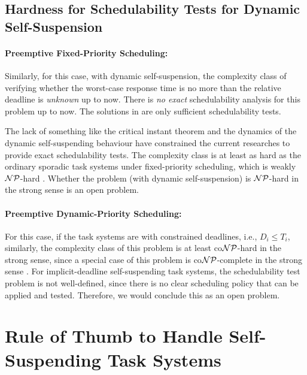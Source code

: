 \subsection{Hardness for Schedulability Tests for Dynamic Self-Suspension}
\paragraph{Preemptive Fixed-Priority Scheduling:}   

Similarly, for this case, with dynamic self-suspension, the complexity class of verifying whether the worst-case response time is no more than the relative deadline is \emph{unknown} up to now. There is \emph{no exact} schedulability analysis for this problem up to now. The solutions in \cite{Liu:2000:RS:518501}\cite{LiuChen:rtss2014}\cite{huangpass:dac2015} are only sufficient schedulability tests. 

The lack of something like the critical instant theorem and the dynamics of the dynamic self-suspending behaviour have constrained the current researches to provide exact schedulability tests. The complexity class is at least as hard as the ordinary sporadic task systems under fixed-priority scheduling, which is weakly ${\cal NP}$-hard \cite{EisenbrandR08}. Whether the problem (with dynamic self-suspension) is ${\cal NP}$-hard in the strong sense is an open problem.

\paragraph{Preemptive Dynamic-Priority Scheduling:} 
For this case, if the task systems are with constrained deadlines, i.e., $D_i \leq T_i$, similarly, the complexity class of this problem is at least co${\cal NP}$-hard in the strong sense, since a special case of this problem is co${\cal NP}$-complete in the strong sense \cite{DBLP:conf/ecrts/Ekberg015}. For implicit-deadline self-suspending task systems, the schedulability test problem is not well-defined, since there is no clear scheduling policy that can be applied and tested. Therefore, we would conclude this as an open problem.

  
\section{Rule of Thumb to Handle Self-Suspending Task Systems}